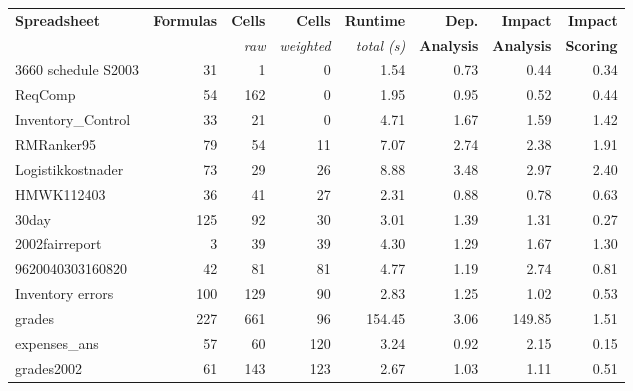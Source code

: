 \begin{table}[!t]
  \centering \begin{tabular}{l|rrr||r|rrr}
 \small{\bf{Spreadsheet}} & \small{\bf{Formulas}} & \small{\bf{Cells}} & \small{\bf{Cells}} & \small{\bf{Runtime}} & \small{\bf{Dep.}} & \small{\bf{Impact}}   & \small{\bf{Impact}} \\
 & & {\small{\it{raw}}} & {\small{\it{weighted}}} & \small{\it{total (s)}} & \small{\bf{Analysis}} & \small{\bf{Analysis}} & \small{\bf{Scoring}} \\
\hline
\small{3660 schedule S2003} & \small{31} & \small{1} & \small{0} & \small{1.54} & \small{0.73} & \small{0.44} & \small{0.34} \\ 
\small{ReqComp} & \small{54} & \small{162} & \small{0} & \small{1.95} & \small{0.95} & \small{0.52} & \small{0.44} \\ 
\small{Inventory\_Control} & \small{33} & \small{21} & \small{0} & \small{4.71} & \small{1.67} & \small{1.59} & \small{1.42} \\ 
\small{RMRanker95} & \small{79} & \small{54} & \small{11} & \small{7.07} & \small{2.74} & \small{2.38} & \small{1.91} \\ 
\small{Logistikkostnader} & \small{73} & \small{29} & \small{26} & \small{8.88} & \small{3.48} & \small{2.97} & \small{2.40} \\  
\small{HMWK112403} & \small{36} & \small{41} & \small{27} & \small{2.31} & \small{0.88} & \small{0.78} & \small{0.63} \\ 
\small{30day} & \small{125} & \small{92} & \small{30} & \small{3.01} & \small{1.39} & \small{1.31} & \small{0.27} \\ 
\small{2002fairreport} & \small{3} & \small{39} & \small{39} & \small{4.30} & \small{1.29} & \small{1.67} & \small{1.30} \\ 
\small{9620040303160820} & \small{42} & \small{81} & \small{81} & \small{4.77} & \small{1.19} & \small{2.74} & \small{0.81} \\  
\small{Inventory errors} & \small{100} & \small{129} & \small{90} & \small{2.83} & \small{1.25} & \small{1.02} & \small{0.53} \\ 
\small{grades} & \small{227} & \small{661} & \small{96} & \small{154.45} & \small{3.06} & \small{149.85} & \small{1.51} \\ 
\small{expenses\_ans} & \small{57} & \small{60} & \small{120} & \small{3.24} & \small{0.92} & \small{2.15} & \small{0.15} \\ 
\small{grades2002} & \small{61} & \small{143} & \small{123} & \small{2.67} & \small{1.03} & \small{1.11} & \small{0.51} \\ 

\end{tabular}
\end{table}
